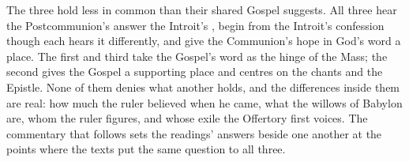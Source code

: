 The three hold less in common than their shared Gospel suggests. All three
hear the Postcommunion's  answer the Introit's
, begin from the Introit's confession though each hears
it differently, and give the Communion's hope in God's word a place. The first
and third take the Gospel's word as the hinge of the Mass; the second gives the
Gospel a supporting place and centres on the chants and the Epistle. None of
them denies what another holds, and the differences inside them are real: how
much the ruler believed when he came, what the willows of Babylon are, whom the
ruler figures, and whose exile the Offertory first voices. The commentary that
follows sets the readings' answers beside one another at the points where the
texts put the same question to all three.
